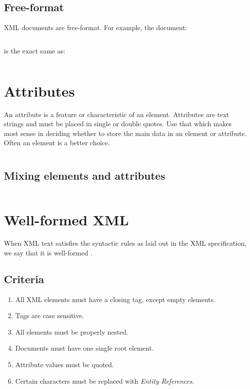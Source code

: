 \documentclass{pgnotes}
\begin{document}
\subsection{Free-format}

XML documents are free-format.
For example, the document:

\inputminted{xml}{free-format-condensed.xml}
  
is the exact same as:
  
\inputminted{xml}{free-format-expanded.xml}


\section{Attributes}

An attribute is a feature or characteristic of an element. Attributes are text strings and must be placed in single or double quotes. 
Use that which makes most sense in deciding whether to store the main data in an element or attribute.
Often an element is a better choice.

\inputminted{xml}{attribute.xml}


\subsection{Mixing elements and attributes}

\inputminted{xml}{mixing.xml}



\section{Well-formed XML}

When XML text satisfies the syntactic rules as laid out in the XML specification, we say that it is well-formed \citep{goldfarb:2003:the-xml-handbook}.

\subsection{Criteria}

\begin{enumerate}
\item All XML elements must have a closing tag, except empty elements. 
\item Tags are case sensitive.
\item All elements must be properly nested.
\item Documents must have one single root element.
\item Attribute values must be quoted.
\item Certain characters must be replaced with \textit{Entity References}. 
\end{enumerate}
\end{document}
